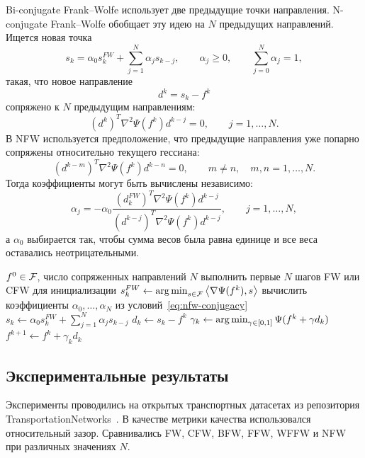 Bi-conjugate Frank--Wolfe использует две предыдущие точки направления.
N-conjugate Frank--Wolfe обобщает эту идею на $N$ предыдущих направлений.
Ищется новая точка
\[
    s_k=
    \alpha_0 s_k^{FW}
    +
    \sum_{j=1}^{N}\alpha_j s_{k-j},
    \qquad
    \alpha_j\geq 0,
    \qquad
    \sum_{j=0}^{N}\alpha_j=1,
\]
такая, что новое направление
\[
    d^k=s_k-f^k
\]
сопряжено к $N$ предыдущим направлениям:
\begin{equation}
    (d^k)^T\nabla^2\Psi(f^k)d^{k-j}=0,
    \qquad
    j=1,\ldots,N.
    \label{eq:nfw-conjugacy}
\end{equation}
В NFW используется предположение, что предыдущие направления уже попарно сопряжены относительно текущего гессиана:
\[
    (d^{k-m})^T\nabla^2\Psi(f^k)d^{k-n}=0,
    \qquad
    m\neq n,\quad m,n=1,\ldots,N.
\]
Тогда коэффициенты могут быть вычислены независимо:
\begin{equation}
    \alpha_j
    =
    -\alpha_0
    \frac{
        (d_k^{FW})^T\nabla^2\Psi(f^k)d^{k-j}
    }{
        (d^{k-j})^T\nabla^2\Psi(f^k)d^{k-j}
    },
    \qquad j=1,\ldots,N,
    \label{eq:nfw-alpha}
\end{equation}
а $\alpha_0$ выбирается так, чтобы сумма весов была равна единице и все веса оставались неотрицательными.

\begin{algorithm}
\caption{N-conjugate Frank--Wolfe}
\begin{algorithmic}
\REQUIRE $f^0\in\mathcal{F}$, число сопряженных направлений $N$
\STATE выполнить первые $N$ шагов FW или CFW для инициализации
\REPEAT
\STATE $s_k^{FW}\gets\operatorname*{arg\,min}_{s\in\mathcal{F}}\left\langle \nabla\Psi(f^k), s \right\rangle$
\STATE вычислить коэффициенты $\alpha_0,\ldots,\alpha_N$ из условий~\eqref{eq:nfw-conjugacy}
\STATE $s_k\gets\alpha_0s_k^{FW}+\sum_{j=1}^{N}\alpha_js_{k-j}$
\STATE $d_k\gets s_k-f^k$
\STATE $\gamma_k\gets\operatorname*{arg\,min}_{\gamma\in[0,1]}\Psi(f^k+\gamma d_k)$
\STATE $f^{k+1}\gets f^k+\gamma_k d_k$
\end{algorithmic}
\end{algorithm}

\subsection{Экспериментальные результаты}

Эксперименты проводились на открытых транспортных датасетах из репозитория TransportationNetworks~\cite{bstabler}.
В качестве метрики качества использовался относительный зазор.
Сравнивались FW, CFW, BFW, FFW, WFFW и NFW при различных значениях $N$.

